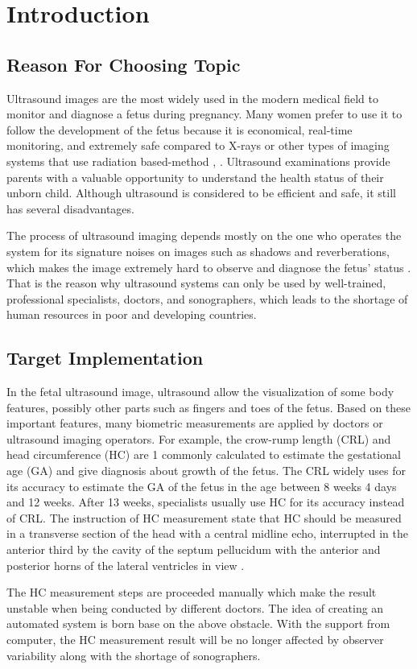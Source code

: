 \chapter{Introduction}
\section{Reason For Choosing Topic}
\label{section:reason_topic}
\noindent
	
	Ultrasound images are the most widely used in the modern medical field to monitor and diagnose a fetus during pregnancy. Many women prefer to use it to follow the development of the fetus because it is economical, real-time monitoring, and extremely safe compared to X-rays or other types of imaging systems that use radiation based-method \cite{rueda}, \cite{shahin}. Ultrasound examinations provide parents with a valuable opportunity to understand the health status of their unborn child. Although ultrasound is considered to be efficient and safe, it still has several disadvantages.
	
	The process of ultrasound imaging depends mostly on the one who operates the system for its signature noises on images such as shadows and reverberations, which makes the image extremely hard to observe and diagnose the fetus’ status \cite{shahin}. That is the reason why ultrasound systems can only be used by well-trained, professional specialists, doctors, and sonographers, which leads to the shortage of human resources in poor and developing countries.
	
\section{Target Implementation}
\label{section:target_implementation}
\noindent
	
	In the fetal ultrasound image, ultrasound allow the visualization of some body features, possibly other parts such as fingers and toes of the fetus. Based on these important features, many biometric measurements are applied by doctors or ultrasound imaging operators. For example, the crow-rump length (CRL) and head circumference (HC) are 1 commonly calculated to estimate the gestational age (GA) and give diagnosis about growth of the fetus. The CRL widely uses for its accuracy to estimate the GA of the fetus in the age between 8 weeks 4 days and 12 weeks. After 13 weeks, specialists usually use HC for its accuracy instead of CRL. The instruction of HC measurement state that HC should be measured in a transverse section of the head with a central midline echo, interrupted in the anterior third by the cavity of the septum pellucidum with the anterior and posterior horns of the lateral ventricles in view \cite{thomas}. 
	
	The HC measurement steps are proceeded manually which make the result unstable when being conducted by different doctors. The idea of creating an automated system is born base on the above obstacle. With the support from computer, the HC measurement result will be no longer affected by observer variability along with the shortage of sonographers.

    
    